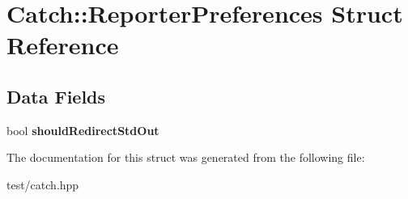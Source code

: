 \hypertarget{structCatch_1_1ReporterPreferences}{}\section{Catch\+:\+:Reporter\+Preferences Struct Reference}
\label{structCatch_1_1ReporterPreferences}
\subsection*{Data Fields}
\begin{DoxyCompactItemize}
\item 
bool {\bfseries should\+Redirect\+Std\+Out}\hypertarget{structCatch_1_1ReporterPreferences_a434511c4080edbbc12e0d1c31ea14769}{}\label{structCatch_1_1ReporterPreferences_a434511c4080edbbc12e0d1c31ea14769}

\end{DoxyCompactItemize}


The documentation for this struct was generated from the following file\+:\begin{DoxyCompactItemize}
\item 
test/catch.\+hpp\end{DoxyCompactItemize}

